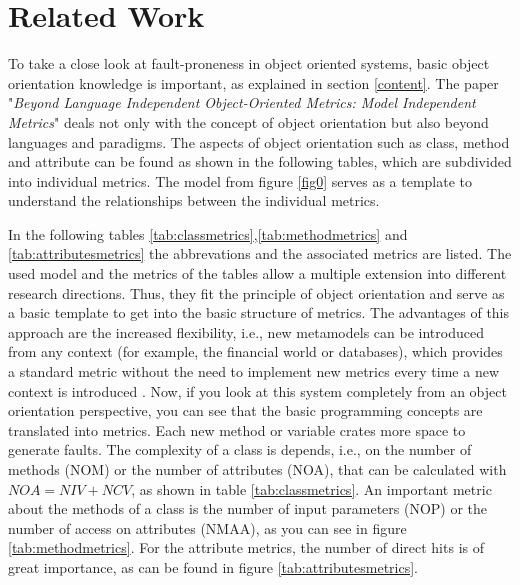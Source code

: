 \section{Related Work}\label{related}

To take a close look at fault-proneness in object oriented systems, basic object orientation knowledge is important, as explained in section \ref{content}. The paper "\textit{Beyond Language Independent Object-Oriented Metrics: Model Independent Metrics}" \cite{lanza2002beyond} deals not only with the concept of object orientation but also beyond languages and paradigms. The aspects of object orientation such as class, method and attribute can be found as shown in the following tables, which are subdivided into individual metrics. The model from figure \ref{fig0} serves as a template to understand the relationships between the individual metrics. 

In the following tables \ref{tab:classmetrics},\ref{tab:methodmetrics} and \ref{tab:attributesmetrics} the abbrevations and the associated metrics are listed. The used model and the metrics of the tables allow a multiple extension into different research directions. Thus, they fit the principle of object orientation and serve as a basic template to get into the basic structure of metrics. The advantages of this approach are the increased flexibility, i.e., new metamodels can be introduced from any context (for example, the financial world or databases), which provides a standard metric without the need to implement new metrics every time a new context is introduced \cite{lanza2002beyond}. Now, if you look at this system completely from an object orientation perspective, you can see that the basic programming concepts are translated into metrics. Each new method or variable crates more space to generate faults. The complexity of a class is depends, i.e., on the number of methods (NOM) or the number of attributes (NOA), that can be calculated with $NOA = NIV + NCV$, as shown in table \ref{tab:classmetrics}. An important metric about the methods of a class is the number of input parameters (NOP) or the number of access on attributes (NMAA), as you can see in figure \ref{tab:methodmetrics}. For the attribute metrics, the number of direct hits is of great importance, as can be found in figure \ref{tab:attributesmetrics}. 

